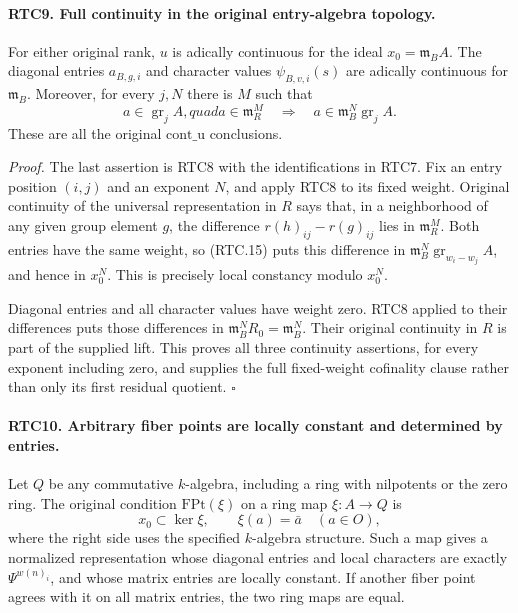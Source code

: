 \documentclass[11pt,a4paper]{article}
\numberwithin{equation}{section}
\theoremstyle{remark}\newtheorem{remark}[theorem]{Remark}
\begin{document}
\paragraph{RTC9. Full continuity in the original entry-algebra topology.}
\label{claim:RTC9}
For either original rank, \(u\) is adically continuous for the
ideal \(x_0=\mathfrak m_BA\).  The diagonal entries
\(a_{B,g,i}\) and character values \(\psi_{B,v,i}(s)\) are
adically continuous for \(\mathfrak m_B\).  Moreover, for every
\(j,N\) there is \(M\) such that
\[
 a\in\operatorname{gr}_jA,quad a\in\mathfrak m_R^M
       \quad\Longrightarrow\quad
 a\in\mathfrak m_B^N\operatorname{gr}_jA.
                                                        \tag{RTC.15}
\]
These are all the original \(\mathrm{cont\_\allowbreak u}\) conclusions.

\emph{Proof.}
The last assertion is RTC8 with the identifications in RTC7.
Fix an entry position \((i,j)\) and an exponent \(N\), and
apply RTC8 to its fixed weight.  Original continuity of the
universal representation in \(R\) says that, in a neighborhood
of any given group element \(g\), the difference
\(r(h)_{ij}-r(g)_{ij}\) lies in \(\mathfrak m_R^M\).
Both entries have the same weight, so (RTC.15) puts this difference
in \(\mathfrak m_B^N\operatorname{gr}_{w_i-w_j}A\), and hence
in \(x_0^N\).  This is precisely local constancy modulo
\(x_0^N\).

Diagonal entries and all character values have weight zero.
RTC8 applied to their differences puts those differences in
\(\mathfrak m_B^N R_0=\mathfrak m_B^N\).  Their original
continuity in \(R\) is part of the supplied lift.  This proves
all three continuity assertions, for every exponent including zero,
and supplies the full fixed-weight cofinality clause rather than
only its first residual quotient. \hfill\(\square\)

\paragraph{RTC10. Arbitrary fiber points are locally constant and determined by entries.}
\label{claim:RTC10}
Let \(Q\) be any commutative \(k\)-algebra, including a ring with
nilpotents or the zero ring.  The original condition
\(\mathrm{FPt}(\xi)\) on a ring map \(\xi:A\to Q\) is
\[
 x_0\subset\ker\xi,\qquad
 \xi(a)=\bar a\quad(a\in O),
                                                        \tag{RTC.16}
\]
where the right side uses the specified \(k\)-algebra structure.
Such a map gives a normalized representation whose diagonal entries
and local characters are exactly \(\Psi^{w(n)_i}\), and whose
matrix entries are locally constant.  If another fiber point agrees
with it on all matrix entries, the two ring maps are equal.
\end{document}
